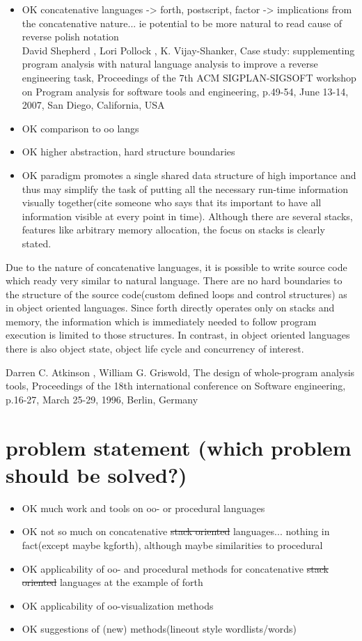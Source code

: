 \begin{itemize}
\item OK concatenative languages -> forth, postscript, factor -> implications from the concatenative nature... ie potential to be more natural to read cause of reverse polish notation \\
	David Shepherd , Lori Pollock , K. Vijay-Shanker, Case study: supplementing program analysis with natural language analysis to improve a reverse engineering task, Proceedings of the 7th ACM SIGPLAN-SIGSOFT workshop on Program analysis for software tools and engineering, p.49-54, June 13-14, 2007, San Diego, California, USA
\item OK comparison to oo langs
\item OK higher abstraction, hard structure boundaries
\item OK paradigm promotes a single shared data structure of high importance and thus may simplify the task of putting all the necessary run-time information visually together(cite someone who says that its important to have all information visible at every point in time). Although there are several stacks, features like arbitrary memory allocation, the focus on stacks is clearly stated.
\end{itemize}

Due to the nature of concatenative languages, it is possible to write source code which ready very similar to natural language. There are no hard boundaries to the structure of the source code(custom defined loops and control structures) as in object oriented languages. Since forth directly operates only on stacks and memory, the information which is immediately needed to follow program execution is limited to those structures. In contrast, in object oriented languages there is also object state, object life cycle and concurrency of interest.

Darren C. Atkinson , William G. Griswold, The design of whole-program analysis tools, Proceedings of the 18th international conference on Software engineering, p.16-27, March 25-29, 1996, Berlin, Germany

\section{problem statement (which problem should be solved?)}

\begin{itemize}
\item OK much work and tools on oo- or procedural languages 
\item OK not so much on concatenative \sout{stack oriented} languages... nothing in fact(except maybe kgforth), although maybe similarities to procedural
\item OK applicability of oo- and procedural methods for concatenative \sout{stack oriented} languages at the example of forth
\item OK applicability of oo-visualization methods
\item OK suggestions of (new) methods(lineout style wordlists/words)
\end{itemize}

